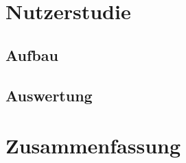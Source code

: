 
\section{Nutzerstudie}

\subsection{Aufbau}



\subsection{Auswertung}



\section{Zusammenfassung}
